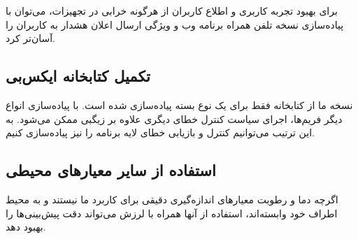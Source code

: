 برای بهبود تجربه کاربری و اطلاع کاربران از هرگونه خرابی در تجهیزات، می‌توان با پیاده‌سازی نسخه تلفن همراه برنامه وب و ویژگی ارسال اعلان هشدار به کاربران را آسان‌تر کرد.

\subsection{تکمیل کتابخانه ایکس‌بی}

نسخه ما از کتابخانه فقط برای یک نوع بسته پیاده‌سازی شده است. با پیاده‌سازی انواع دیگر فریم‌ها، اجرای سیاست کنترل خطای دیگری علاوه بر زیگبی ممکن می‌شود. به این ترتیب می‌توانیم کنترل و بازیابی خطای لایه برنامه را نیز پیاده‌سازی کنیم.

\subsection{استفاده از سایر معیارهای محیطی}

اگرچه دما و رطوبت معیارهای اندازه‌گیری دقیقی برای کاربرد ما نیستند و به محیط اطراف خود وابسته‌اند، استفاده از آنها همراه با لرزش می‌تواند دقت پیش‌بینی‌ها را بهبود دهد.
